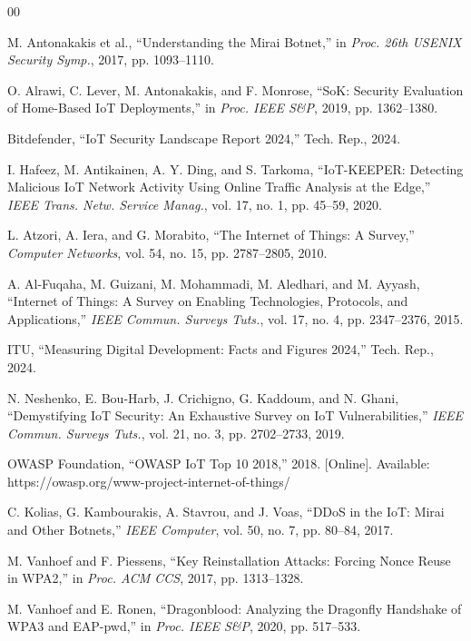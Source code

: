 \documentclass[conference]{IEEEtran}
\begin{document}
\begin{thebibliography}{00}

M. Antonakakis et al., ``Understanding the Mirai Botnet,'' in
\textit{Proc. 26th USENIX Security Symp.}, 2017, pp. 1093--1110.

O. Alrawi, C. Lever, M. Antonakakis, and F. Monrose, ``SoK: Security
Evaluation of Home-Based IoT Deployments,'' in \textit{Proc. IEEE S\&P},
2019, pp. 1362--1380.

Bitdefender, ``IoT Security Landscape Report 2024,'' Tech. Rep., 2024.

I. Hafeez, M. Antikainen, A. Y. Ding, and S. Tarkoma, ``IoT-KEEPER:
Detecting Malicious IoT Network Activity Using Online Traffic Analysis at
the Edge,'' \textit{IEEE Trans. Netw. Service Manag.}, vol. 17, no. 1,
pp. 45--59, 2020.

L. Atzori, A. Iera, and G. Morabito, ``The Internet of Things: A Survey,''
\textit{Computer Networks}, vol. 54, no. 15, pp. 2787--2805, 2010.

A. Al-Fuqaha, M. Guizani, M. Mohammadi, M. Aledhari, and M. Ayyash,
``Internet of Things: A Survey on Enabling Technologies, Protocols, and
Applications,'' \textit{IEEE Commun. Surveys Tuts.}, vol. 17, no. 4,
pp. 2347--2376, 2015.

ITU, ``Measuring Digital Development: Facts and Figures 2024,'' Tech.
Rep., 2024.

N. Neshenko, E. Bou-Harb, J. Crichigno, G. Kaddoum, and N. Ghani,
``Demystifying IoT Security: An Exhaustive Survey on IoT Vulnerabilities,''
\textit{IEEE Commun. Surveys Tuts.}, vol. 21, no. 3, pp. 2702--2733,
2019.

OWASP Foundation, ``OWASP IoT Top 10 2018,'' 2018. [Online]. Available:
https://owasp.org/www-project-internet-of-things/

C. Kolias, G. Kambourakis, A. Stavrou, and J. Voas, ``DDoS in the IoT:
Mirai and Other Botnets,'' \textit{IEEE Computer}, vol. 50, no. 7,
pp. 80--84, 2017.

M. Vanhoef and F. Piessens, ``Key Reinstallation Attacks: Forcing Nonce
Reuse in WPA2,'' in \textit{Proc. ACM CCS}, 2017, pp. 1313--1328.

M. Vanhoef and E. Ronen, ``Dragonblood: Analyzing the Dragonfly
Handshake of WPA3 and EAP-pwd,'' in \textit{Proc. IEEE S\&P}, 2020,
pp. 517--533.


\end{thebibliography}
\end{document}
